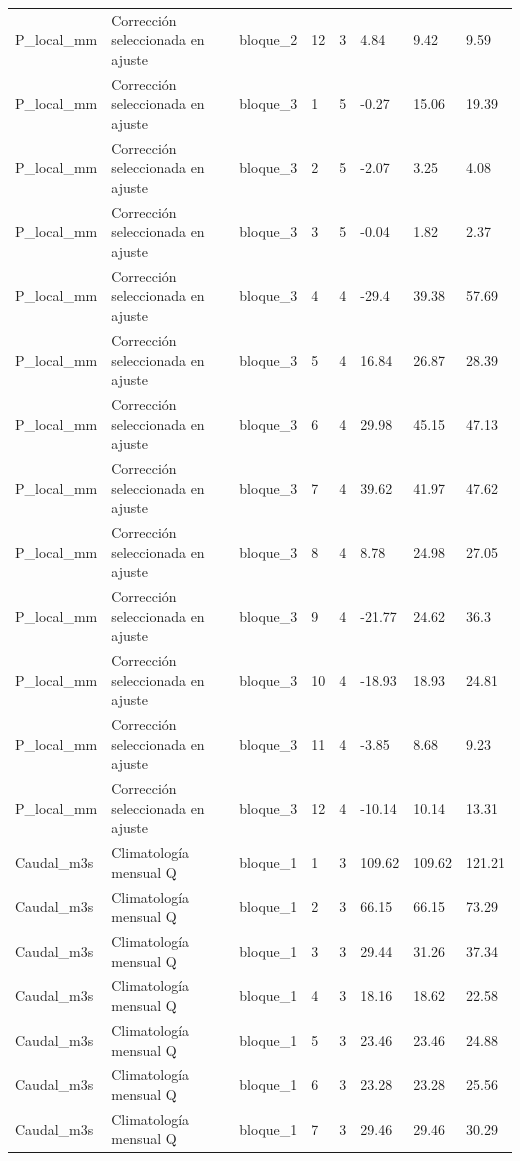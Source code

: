 \begin{longtable}{llllllll}
P\_local\_mm & Corrección seleccionada en ajuste & bloque\_2 & 12 & 3 & 4.84 & 9.42 & 9.59 \\
P\_local\_mm & Corrección seleccionada en ajuste & bloque\_3 & 1 & 5 & -0.27 & 15.06 & 19.39 \\
P\_local\_mm & Corrección seleccionada en ajuste & bloque\_3 & 2 & 5 & -2.07 & 3.25 & 4.08 \\
P\_local\_mm & Corrección seleccionada en ajuste & bloque\_3 & 3 & 5 & -0.04 & 1.82 & 2.37 \\
P\_local\_mm & Corrección seleccionada en ajuste & bloque\_3 & 4 & 4 & -29.4 & 39.38 & 57.69 \\
P\_local\_mm & Corrección seleccionada en ajuste & bloque\_3 & 5 & 4 & 16.84 & 26.87 & 28.39 \\
P\_local\_mm & Corrección seleccionada en ajuste & bloque\_3 & 6 & 4 & 29.98 & 45.15 & 47.13 \\
P\_local\_mm & Corrección seleccionada en ajuste & bloque\_3 & 7 & 4 & 39.62 & 41.97 & 47.62 \\
P\_local\_mm & Corrección seleccionada en ajuste & bloque\_3 & 8 & 4 & 8.78 & 24.98 & 27.05 \\
P\_local\_mm & Corrección seleccionada en ajuste & bloque\_3 & 9 & 4 & -21.77 & 24.62 & 36.3 \\
P\_local\_mm & Corrección seleccionada en ajuste & bloque\_3 & 10 & 4 & -18.93 & 18.93 & 24.81 \\
P\_local\_mm & Corrección seleccionada en ajuste & bloque\_3 & 11 & 4 & -3.85 & 8.68 & 9.23 \\
P\_local\_mm & Corrección seleccionada en ajuste & bloque\_3 & 12 & 4 & -10.14 & 10.14 & 13.31 \\
Caudal\_m3s & Climatología mensual Q & bloque\_1 & 1 & 3 & 109.62 & 109.62 & 121.21 \\
Caudal\_m3s & Climatología mensual Q & bloque\_1 & 2 & 3 & 66.15 & 66.15 & 73.29 \\
Caudal\_m3s & Climatología mensual Q & bloque\_1 & 3 & 3 & 29.44 & 31.26 & 37.34 \\
Caudal\_m3s & Climatología mensual Q & bloque\_1 & 4 & 3 & 18.16 & 18.62 & 22.58 \\
Caudal\_m3s & Climatología mensual Q & bloque\_1 & 5 & 3 & 23.46 & 23.46 & 24.88 \\
Caudal\_m3s & Climatología mensual Q & bloque\_1 & 6 & 3 & 23.28 & 23.28 & 25.56 \\
Caudal\_m3s & Climatología mensual Q & bloque\_1 & 7 & 3 & 29.46 & 29.46 & 30.29 \\

\end{longtable}
